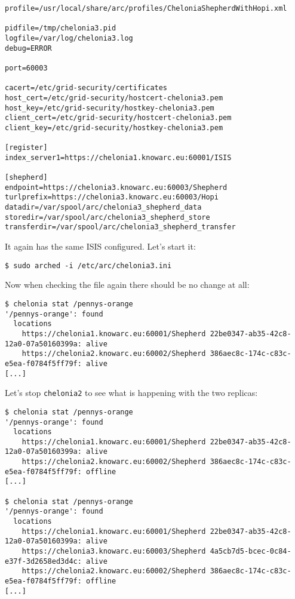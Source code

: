 \documentclass{article}
\begin{document}
\begin{verbatim}
profile=/usr/local/share/arc/profiles/CheloniaShepherdWithHopi.xml

pidfile=/tmp/chelonia3.pid
logfile=/var/log/chelonia3.log
debug=ERROR

port=60003

cacert=/etc/grid-security/certificates
host_cert=/etc/grid-security/hostcert-chelonia3.pem
host_key=/etc/grid-security/hostkey-chelonia3.pem
client_cert=/etc/grid-security/hostcert-chelonia3.pem
client_key=/etc/grid-security/hostkey-chelonia3.pem

[register]
index_server1=https://chelonia1.knowarc.eu:60001/ISIS

[shepherd]
endpoint=https://chelonia3.knowarc.eu:60003/Shepherd
turlprefix=https://chelonia3.knowarc.eu:60003/Hopi
datadir=/var/spool/arc/chelonia3_shepherd_data
storedir=/var/spool/arc/chelonia3_shepherd_store
transferdir=/var/spool/arc/chelonia3_shepherd_transfer
\end{verbatim}

It again has the same ISIS configured. Let's start it:

\begin{verbatim}
$ sudo arched -i /etc/arc/chelonia3.ini
\end{verbatim}

Now when checking the file again there should be no change at all:

\begin{verbatim}
$ chelonia stat /pennys-orange
'/pennys-orange': found
  locations
    https://chelonia1.knowarc.eu:60001/Shepherd 22be0347-ab35-42c8-12a0-07a50160399a: alive
    https://chelonia2.knowarc.eu:60002/Shepherd 386aec8c-174c-c83c-e5ea-f0784f5ff79f: alive
[...]
\end{verbatim}

Let's stop \verb!chelonia2! to see what is happening with the two replicas:

\begin{verbatim}
$ chelonia stat /pennys-orange
'/pennys-orange': found
  locations
    https://chelonia1.knowarc.eu:60001/Shepherd 22be0347-ab35-42c8-12a0-07a50160399a: alive
    https://chelonia2.knowarc.eu:60002/Shepherd 386aec8c-174c-c83c-e5ea-f0784f5ff79f: offline
[...]

$ chelonia stat /pennys-orange
'/pennys-orange': found
  locations
    https://chelonia1.knowarc.eu:60001/Shepherd 22be0347-ab35-42c8-12a0-07a50160399a: alive
    https://chelonia3.knowarc.eu:60003/Shepherd 4a5cb7d5-bcec-0c84-e37f-3d2658ed3d4c: alive
    https://chelonia2.knowarc.eu:60002/Shepherd 386aec8c-174c-c83c-e5ea-f0784f5ff79f: offline
[...]

\end{verbatim}
\end{document}
